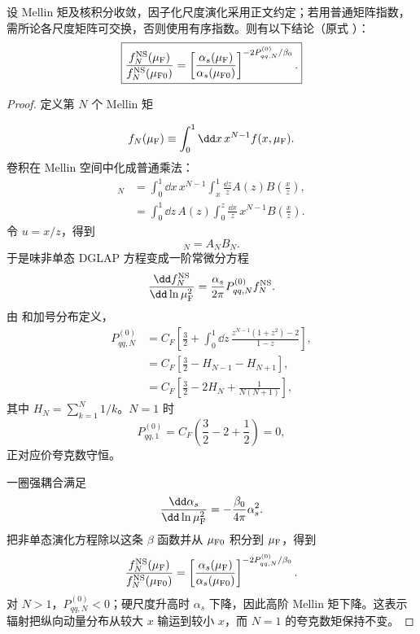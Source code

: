 \begin{proposition}
设 Mellin 矩及核积分收敛，因子化尺度演化采用正文约定；若用普通矩阵指数，需所论各尺度矩阵可交换，否则使用有序指数。则有以下结论（原式 ）：
\begin{equation*}
 \boxed{
 \frac{f_N^{\rm NS}(\mu_{\rm F})}{f_N^{\rm NS}(\mu_{\rm F0})}
 =\left[
 \frac{\alpha_s(\mu_{\rm F})}{\alpha_s(\mu_{\rm F0})}
 \right]^{-2P_{qq,N}^{(0)}/\beta_0}.}
\end{equation*}
\end{proposition}
\begin{proof}
定义第 $N$ 个 Mellin 矩

\begin{equation*}
 f_N(\mu_{\rm F})
 \equiv\int_0^1\dd x\,x^{N-1}f(x,\mu_{\rm F}).
\end{equation*}
卷积在 Mellin 空间中化成普通乘法：
\begin{align*}
 [A\otimes B]_N
 &=\int_0^1\dd x\,x^{N-1}
 \int_x^1\frac{\dd z}{z}
 A(z)B\!\left(\frac{x}{z}\right),\\
 &=\int_0^1\dd z\,A(z)
 \int_0^z\frac{\dd x}{z}\,x^{N-1}
 B\!\left(\frac{x}{z}\right).
\end{align*}
令 $u=x/z$，得到
\begin{equation*}
 [A\otimes B]_N=A_NB_N.
\end{equation*}
于是味非单态 DGLAP 方程变成一阶常微分方程
\begin{equation*}
 \frac{\dd f_N^{\rm NS}}{\dd\ln\mu_{\rm F}^2}
 =\frac{\alpha_s}{2\pi}P_{qq,N}^{(0)}f_N^{\rm NS}.
\end{equation*}
由 和加号分布定义，
\begin{align*}
 P_{qq,N}^{(0)}
 &=C_F\left[
 \frac32+
 \int_0^1\dd z\,
 \frac{z^{N-1}(1+z^2)-2}{1-z}
 \right],\\
 &=C_F\left[
 \frac32-H_{N-1}-H_{N+1}
 \right],\\
 &=C_F\left[
 \frac32-2H_N+\frac{1}{N(N+1)}
 \right],
\end{align*}
其中 $H_N=\sum_{k=1}^N1/k$。$N=1$ 时
\begin{equation*}
 P_{qq,1}^{(0)}
 =C_F\left(\frac32-2+\frac12\right)=0,
\end{equation*}
正对应价夸克数守恒。

一圈强耦合满足
\begin{equation*}
 \frac{\dd\alpha_s}{\dd\ln\mu_{\rm F}^2}
 =-\frac{\beta_0}{4\pi}\alpha_s^2.
\end{equation*}
把非单态演化方程除以这条 $\beta$ 函数并从 $\mu_{\rm F0}$ 积分到 $\mu_{\rm F}$，得到
\begin{equation*}
 \frac{f_N^{\rm NS}(\mu_{\rm F})}{f_N^{\rm NS}(\mu_{\rm F0})}
 =\left[
 \frac{\alpha_s(\mu_{\rm F})}{\alpha_s(\mu_{\rm F0})}
 \right]^{-2P_{qq,N}^{(0)}/\beta_0}.
\end{equation*}
对 $N>1$，$P_{qq,N}^{(0)}<0$；硬尺度升高时 $\alpha_s$ 下降，因此高阶 Mellin 矩下降。这表示辐射把纵向动量分布从较大 $x$ 输运到较小 $x$，而 $N=1$ 的夸克数矩保持不变。
\end{proof}

